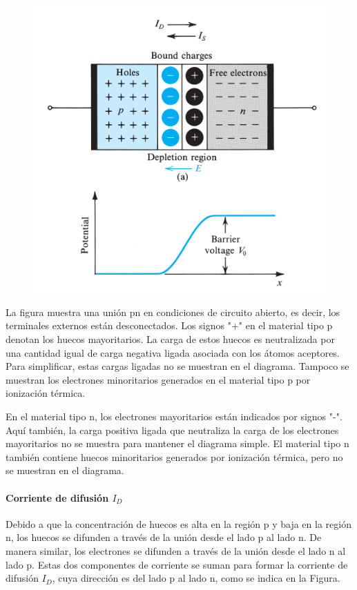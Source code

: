 \begin{figure}[H]
    \centering
    \includegraphics[scale=0.6]{Electronica/pn_f2.png}
\end{figure}

La figura muestra una unión pn en condiciones de circuito abierto, es decir, los terminales externos están desconectados. Los signos "+" en el material tipo p denotan los huecos mayoritarios. La carga de estos huecos es neutralizada por una cantidad igual de carga negativa ligada asociada con los átomos aceptores. Para simplificar, estas cargas ligadas no se muestran en el diagrama. Tampoco se muestran los electrones minoritarios generados en el material tipo p por ionización térmica.

En el material tipo n, los electrones mayoritarios están indicados por signos "-". Aquí también, la carga positiva ligada que neutraliza la carga de los electrones mayoritarios no se muestra para mantener el diagrama simple. El material tipo n también contiene huecos minoritarios generados por ionización térmica, pero no se muestran en el diagrama.

\paragraph*{Corriente de difusión $I_D$} Debido a que la concentración de huecos es alta en la región p y baja en la región n, los huecos se difunden a través de la unión desde el lado p al lado n. De manera similar, los electrones se difunden a través de la unión desde el lado n al lado p. Estas dos componentes de corriente se suman para formar la corriente de difusión $I_D$, cuya dirección es del lado p al lado n, como se indica en la Figura.

